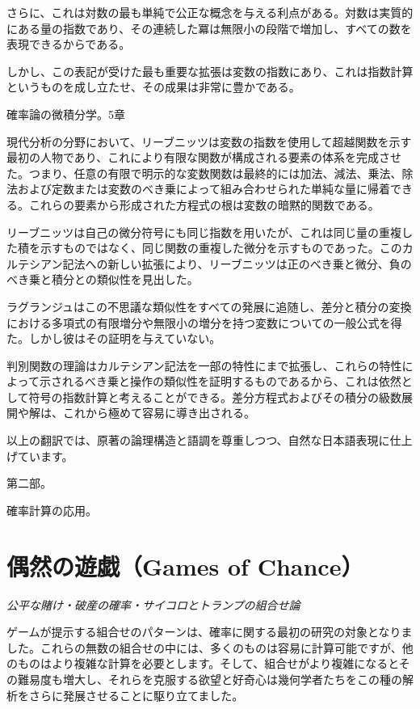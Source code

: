 \documentclass[a4paper,11pt,openany]{ltjsbook}
\begin{document}
さらに、これは対数の最も単純で公正な概念を与える利点がある。対数は実質的にある量の指数であり、その連続した冪は無限小の段階で増加し、すべての数を表現できるからである。

しかし、この表記が受けた最も重要な拡張は変数の指数にあり、これは指数計算というものを成し立たせ、その成果は非常に豊かである。

確率論の微積分学。5章

現代分析の分野において、リーブニッツは変数の指数を使用して超越関数を示す最初の人物であり、これにより有限な関数が構成される要素の体系を完成させた。つまり、任意の有限で明示的な変数関数は最終的には加法、減法、乗法、除法および定数または変数のべき乗によって組み合わせられた単純な量に帰着できる。これらの要素から形成された方程式の根は変数の暗黙的関数である。

リーブニッツは自己の微分符号にも同じ指数を用いたが、これは同じ量の重複した積を示すものではなく、同じ関数の重複した微分を示すものであった。このカルテシアン記法への新しい拡張により、リーブニッツは正のべき乗と微分、負のべき乗と積分との類似性を見出した。

ラグランジュはこの不思議な類似性をすべての発展に追随し、差分と積分の変換における多項式の有限増分や無限小の増分を持つ変数についての一般公式を得た。しかし彼はその証明を与えていない。

判別関数の理論はカルテシアン記法を一部の特性にまで拡張し、これらの特性によって示されるべき乗と操作の類似性を証明するものであるから、これは依然として符号の指数計算と考えることができる。差分方程式およびその積分の級数展開や解は、これから極めて容易に導き出される。

以上の翻訳では、原著の論理構造と語調を尊重しつつ、自然な日本語表現に仕上げています。

第二部。

確率計算の応用。

\newpage

\chapter{偶然の遊戯（Games of Chance）}
\label{ch:vi}

\begin{center}
\large\textit{公平な賭け・破産の確率・サイコロとトランプの組合せ論}
\end{center}
\vspace{4mm}

ゲームが提示する組合せのパターンは、確率に関する最初の研究の対象となりました。これらの無数の組合せの中には、多くのものは容易に計算可能ですが、他のものはより複雑な計算を必要とします。そして、組合せがより複雑になるとその難易度も増大し、それらを克服する欲望と好奇心は幾何学者たちをこの種の解析をさらに発展させることに駆り立てました。
\end{document}
